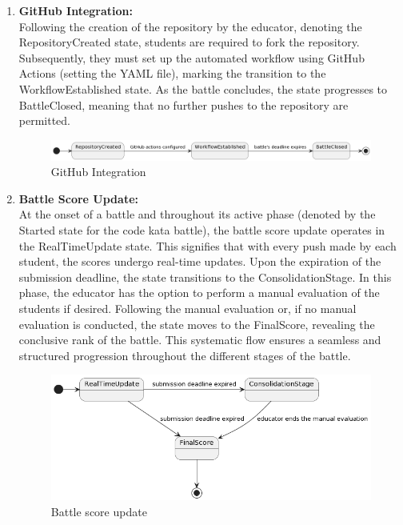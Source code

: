 \begin{enumerate}
    \item \textbf{GitHub Integration:} \\
    Following the creation of the repository by the educator, denoting the RepositoryCreated state, students are required to fork the repository. Subsequently, they must set up the automated workflow using GitHub Actions (setting the YAML file), marking the transition to the WorkflowEstablished state. As the battle concludes, the state progresses to BattleClosed, meaning that no further pushes to the repository are permitted.
        \begin{figure}[H]
              \centering
              \includegraphics[width=1\textwidth]{Images/SC_GitHubConfiguration.png}
              \caption{GitHub Integration}
              \label{fig:CKBLifecycle}
        \end{figure}
    

    \item \textbf{Battle Score Update:} \\
    At the onset of a battle and throughout its active phase (denoted by the Started state for the code kata battle), the battle score update operates in the RealTimeUpdate state. This signifies that with every push made by each student, the scores undergo real-time updates. Upon the expiration of the submission deadline, the state transitions to the ConsolidationStage. In this phase, the educator has the option to perform a manual evaluation of the students if desired. Following the manual evaluation or, if no manual evaluation is conducted, the state moves to the FinalScore, revealing the conclusive rank of the battle. This systematic flow ensures a seamless and structured progression throughout the different stages of the battle.
        \begin{figure}[H]
              \centering
              \includegraphics[width=1\textwidth]{Images/SC_BattleScoreUpdate.png}
              \caption{Battle score update}
              \label{fig:CKBLifecycle}
        \end{figure}
    
\end{enumerate}

